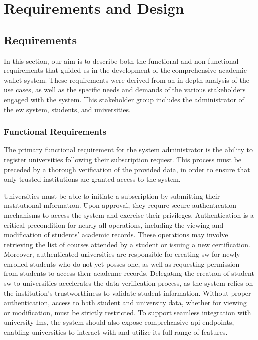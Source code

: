\chapter{Requirements and Design}

\section{Requirements}
In this section, our aim is to describe both the functional and non-functional requirements that guided us in the development of the comprehensive academic wallet system. These requirements were derived from an in-depth analysis of the use cases, as well as the specific needs and demands of the various stakeholders engaged with the system. This stakeholder group includes the administrator of the \acrshort{ew} system, students, and universities.

\subsection{Functional Requirements}
The primary functional requirement for the system administrator is the ability to register universities following their subscription request. This process must be preceded by a thorough verification of the provided data, in order to ensure that only trusted institutions are granted access to the system.

Universities must be able to initiate a subscription by submitting their institutional information. Upon approval, they require secure authentication mechanisms to access the system and exercise their privileges. Authentication is a critical precondition for nearly all operations, including the viewing and modification of students' academic records. These operations may involve retrieving the list of courses attended by a student or issuing a new certification. Moreover, authenticated universities are responsible for creating \acrshort{sw} for newly enrolled students who do not yet posses one, as well as requesting permission from students to access their academic records. Delegating the creation of student \acrshort{sw} to universities accelerates the data verification process, as the system relies on the institution's trustworthiness to validate student information. Without proper authentication, access to both student and university data, whether for viewing or modification, must be strictly restricted. To support seamless integration with university \acrshort{lms}, the system should also expose comprehensive \acrshort{api} endpoints, enabling universities to interact with and utilize its full range of features.

